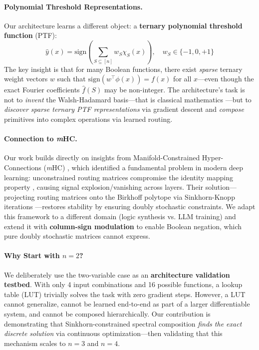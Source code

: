 \documentclass[Royal,times,sageh]{sagej}
\newcommand{\sign}{\text{sign}}
\newcommand{\mHC}{\textit{m}HC}
\begin{document}
\paragraph{Polynomial Threshold Representations.} Our architecture learns a different object: a \textbf{ternary polynomial threshold function} (PTF):
\begin{equation}
\label{eq:ptf}
    \hat{y}(x) = \sign\left(\sum_{S \subseteq [n]} w_S \chi_S(x)\right), \quad w_S \in \{-1, 0, +1\}
\end{equation}
The key insight is that for many Boolean functions, there exist \textit{sparse} ternary weight vectors $w$ such that $\sign(w^\top \phi(x)) = f(x)$ for all $x$---even though the exact Fourier coefficients $\hat{f}(S)$ may be non-integer. The architecture's task is not to \textit{invent} the Walsh-Hadamard basis---that is classical mathematics \cite{linial1993constant}---but to \textit{discover sparse ternary PTF representations} via gradient descent and \textit{compose} primitives into complex operations via learned routing.

\paragraph{Connection to \mHC.} Our work builds directly on insights from Manifold-Constrained Hyper-Connections (\mHC) \cite{xie2024mhc}, which identified a fundamental problem in modern deep learning: unconstrained routing matrices compromise the identity mapping property \cite{he2016identity}, causing signal explosion/vanishing across layers. Their solution---projecting routing matrices onto the Birkhoff polytope via Sinkhorn-Knopp iterations \cite{sinkhorn1967concerning}---restores stability by ensuring doubly stochastic constraints. We adapt this framework to a different domain (logic synthesis vs. LLM training) and extend it with \textbf{column-sign modulation} to enable Boolean negation, which pure doubly stochastic matrices cannot express.

\paragraph{Why Start with $n=2$?} We deliberately use the two-variable case as an \textbf{architecture validation testbed}. With only 4 input combinations and 16 possible functions, a lookup table (LUT) trivially solves the task with zero gradient steps. However, a LUT cannot generalize, cannot be learned end-to-end as part of a larger differentiable system, and cannot be composed hierarchically. Our contribution is demonstrating that Sinkhorn-constrained spectral composition \textit{finds the exact discrete solution} via continuous optimization---then validating that this mechanism scales to $n=3$ and $n=4$.
\end{document}
